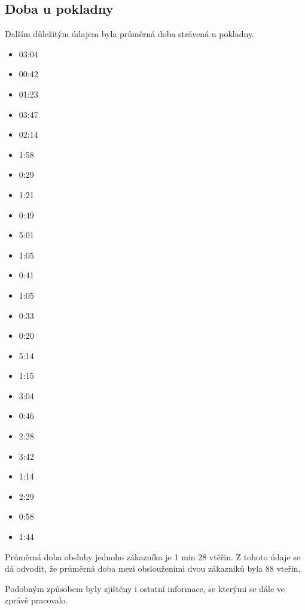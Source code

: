 \documentclass[12pt,a4paper,titlepage]{article}
\begin{document}
\subsection{Doba u pokladny}
Dalším důležitým údajem byla průměrná doba strávená u pokladny.
\begin{multicols}{	3}
\begin{itemize}
\item 03:04
\item 00:42
\item 01:23
\item 03:47
\item 02:14
\item 1:58
\item 0:29
\item 1:21
\item 0:49
\item 5:01
\item 1:05
\item 0:41
\item 1:05
\item 0:33
\item 0:20
\item 5:14
\item 1:15
\item 3:04
\item 0:46
\item 2:28
\item 3:42
\item 1:14
\item 2:29
\item 0:58
\item 1:44
\end{itemize}
\end{multicols}
Průměrná doba obsluhy jednoho zákazníka je 1 min 28 vtěřin. Z tohoto údaje se dá odvodit, že průměrná doba mezi obslouženími dvou zákazníků byla 88 vteřin.

Podobným způsobem byly zjištěny i ostatní informace, se kterými se dále ve zprávě pracovalo. 
\end{document}
